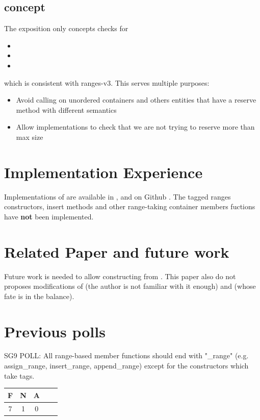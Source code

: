 \documentclass{wg21}
\begin{document}
\subsection{ concept}

The exposition only  concepts checks for
\begin{itemize}
    \item {}
    \item {}
    \item {}
\end{itemize}

which is consistent with ranges-v3. This serves multiple purposes:

\begin{itemize}
\item Avoid calling  on unordered containers and others entities that have a reserve method with different
semantics
\item Allow implementations to check that we are not trying to reserve more than max size
\end{itemize}


\section{Implementation Experience}

Implementations of  are available in \cite{Range V3}, \cite{cmcstl2} and on Github \cite{rangesnext}.
The tagged ranges constructors, insert methods and other range-taking container members fuctions have \textbf{not} been
implemented.

\section{Related Paper and future work}

Future work is needed to allow constructing  from .
This paper also do not proposes modifications of (the author is not familiar with it enough) and  (whose fate is in the balance).

\section{Previous polls}


\begin{quoteblock}
SG9 POLL: All range-based member functions should end with "_range" (e.g. assign_range, insert_range, append_range) except for the constructors which take tags.

\begin{tabular}{|c|c|c|c|c|}
\hline
F & N & A\\
\hline
7 & 1 & 0 \\
\hline
\end{tabular}
\end{quoteblock}
\end{document}

